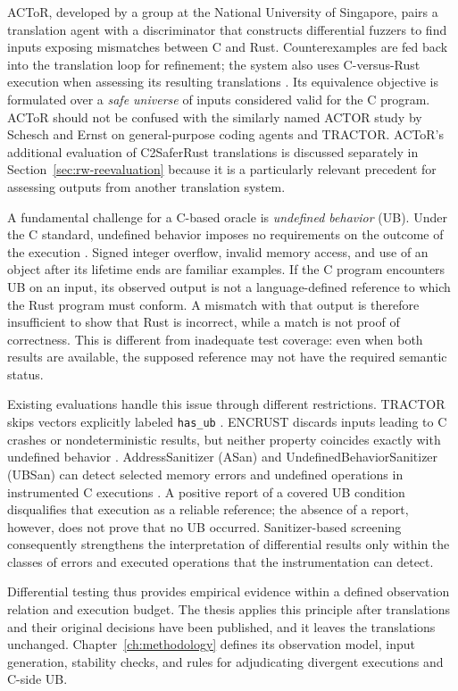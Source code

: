 ACToR, developed by a group at the National University of Singapore,
pairs a translation agent with a discriminator that constructs
differential fuzzers to find inputs exposing mismatches between C and
Rust. Counterexamples are fed back into the translation loop for
refinement; the system also uses C-versus-Rust execution when assessing
its resulting translations \cite{actor2025}. Its equivalence objective
is formulated over a \emph{safe universe} of inputs considered valid for
the C program. ACToR should not be confused with the similarly named
ACTOR study by Schesch and Ernst on general-purpose coding agents and
TRACTOR. ACToR's additional evaluation of C2SaferRust translations is
discussed separately in Section~\ref{sec:rw-reevaluation} because it is a particularly
relevant precedent for assessing outputs from another translation
system.

\label{sec:bg-ub}%
A fundamental challenge for a C-based oracle is \emph{undefined
behavior} (UB). Under the C standard, undefined behavior imposes no
requirements on the outcome of the execution \cite{wg14n2176}. Signed
integer overflow, invalid memory access, and use of an object after its
lifetime ends are familiar examples. If the C program encounters UB on
an input, its observed output is not a language-defined reference to
which the Rust program must conform. A mismatch with that output is
therefore insufficient to show that Rust is incorrect, while a match is
not proof of correctness. This is different from inadequate test
coverage: even when both results are available, the supposed reference
may not have the required semantic status.

Existing evaluations handle this issue through different restrictions.
TRACTOR skips vectors explicitly labeled \texttt{has\_ub}
\cite{tractor-test-corpus}. ENCRUST discards inputs leading to C crashes
or nondeterministic results, but neither property coincides exactly with
undefined behavior \cite{sim2026encrust}. AddressSanitizer (ASan) and
UndefinedBehaviorSanitizer (UBSan) can detect selected memory errors and
undefined operations in instrumented C executions
\cite{asan-docs,ubsan}. A positive report of a covered UB condition
disqualifies that execution as a reliable reference; the absence of a
report, however, does not prove that no UB occurred. Sanitizer-based
screening consequently strengthens the interpretation of differential
results only within the classes of errors and executed operations that
the instrumentation can detect.

Differential testing thus provides empirical evidence within a defined
observation relation and execution budget. The thesis applies this principle after translations and their original decisions have been published, and it leaves the translations unchanged. Chapter~\ref{ch:methodology} defines its observation model, input generation,
stability checks, and rules for adjudicating divergent executions and
C-side UB.

